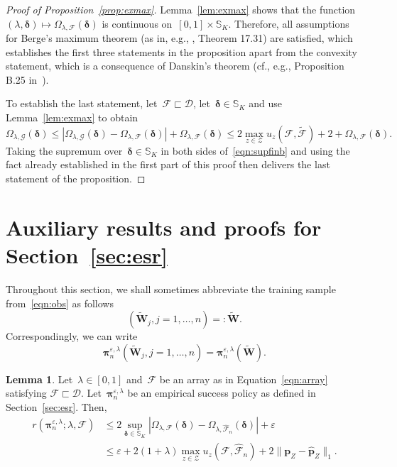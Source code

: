 \documentclass[11pt, a4paper]{article}
\theoremstyle{definition}
\newtheorem{lemma}[theorem]{Lemma}
\begin{document}
\begin{proof}[Proof of Proposition~\ref{prop:exmax}]
Lemma~\ref{lem:exmax} shows that the function~$(\lambda, \bm{\delta}) \mapsto \Omega_{\lambda, \mathcal{F}}(\bm{\delta})$ is continuous on~$[0, 1] \times \mathbb{S}_K$. Therefore, all assumptions for Berge's maximum theorem (as in, e.g., \cite{hhg}, Theorem 17.31) are satisfied, which establishes the first three statements in the proposition apart from the convexity statement, which is a consequence of Danskin's theorem (cf., e.g., Proposition B.25 in~\cite{bertsekas}).

To establish the last statement, let~$\mathcal{F} \sqsubset \mathscr{D}$, let~$\bm{\delta} \in \mathbb{S}_K$ and use Lemma~\ref{lem:exmax} to obtain 
%
\begin{equation}\label{eqn:supfinb}
\Omega_{\lambda, \mathcal{G}}(\bm{\delta}) \leq  |\Omega_{\lambda, \mathcal{G}}(\bm{\delta}) - \Omega_{\lambda, \mathcal{F}}(\bm{\delta})| + \Omega_{\lambda, \mathcal{F}}(\bm{\delta}) \leq 2 \max_{z \in \mathcal{Z}} u_z(\mathcal{F}, \tilde{\mathcal{F}}) + 2 + \Omega_{\lambda, \mathcal{F}}(\bm{\delta}).
\end{equation}
%
Taking the supremum over~$\bm{\delta} \in \mathbb{S}_K$ in both sides of~\eqref{eqn:supfinb} and using the fact already established in the first part of this proof then delivers the last statement of the proposition.
\end{proof}

\section{Auxiliary results and proofs for Section~\ref{sec:esr}}

Throughout this section, we shall sometimes abbreviate the training sample from~\eqref{eqn:obs} as follows
\begin{equation}\label{eqn:notconv}\left(\tilde{\bm{W}}_j, j = 1, \hdots, n\right) =: \tilde{\bm{W}}.
\end{equation} 
Correspondingly, we can write
%
$$\bm{\pi}^{\varepsilon, \lambda}_n\left(\tilde{\bm{W}}_j, j = 1, \hdots, n\right) = \bm{\pi}^{\varepsilon, \lambda}_n(\tilde{\bm{W}}).$$
%
\begin{lemma}\label{lem:upreg}
Let~$\lambda \in [0, 1]$ and~$\mathcal{F}$ be an array as in Equation~\eqref{eqn:array} satisfying $\mathcal{F} \sqsubset \mathscr{D}$. Let~$\bm{\pi}^{\varepsilon, \lambda}_n$ be an empirical success policy as defined in Section~\ref{sec:esr}. Then,
%
\begin{align*}
r(\bm{\pi}^{\varepsilon, \lambda}_n; \lambda, \mathcal{F})
&\leq 2 \sup_{\bm{\delta} \in \mathbb{S}_K} |\Omega_{\lambda, \mathcal{F}}(\bm{\delta}) - \Omega_{\lambda, \hat{\mathcal{F}}_n}(\bm{\delta})| + \varepsilon \\ &\leq \varepsilon + 2(1+\lambda) \max_{z \in \mathcal{Z}} u_z(\mathcal{F}, \hat{\mathcal{F}}_n) + 2 \|\bm{p}_Z - \hat{\bm{p}}_Z\|_1.
\end{align*}

\end{lemma}
\end{document}
